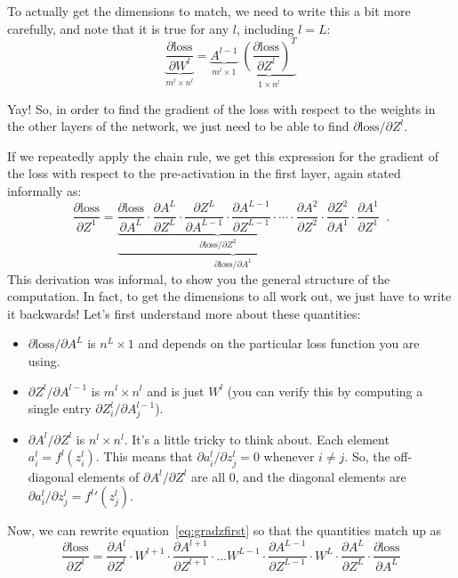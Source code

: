 \documentclass[11pt]{article}
\begin{document}
To actually get  the dimensions to match, we need to write this a bit
more carefully, and note that it is true for any $l$, including $l =  L$:
\begin{equation}
\label{eq:gradloss}
  \underbrace{\frac{\partial \text{loss}}{\partial W^l}}_{m^l \times n^l}  =  
\underbrace{A^{l-1}}_{m^l \times 1} \;
\underbrace{\left(\frac{\partial \text{loss}}{\partial
                                              Z^l}\right)^T}_{1 \times n^l}
\end{equation}

Yay!  So, in order to find the gradient of the loss with respect to the
weights in the other layers of the network, we just need to be able to
find $\partial \text{loss}/\partial{Z^l}$.  

If we repeatedly apply
the chain rule, we get this expression for the gradient of the loss
with respect to the pre-activation in the first layer, again stated informally as:
\begin{equation}
\label{eq:gradzfirst}
  \frac{\partial \text{loss}}{\partial Z^1} = \underbrace{\underbrace{
  \frac{\partial \text{loss}}{\partial A^L} \cdot
  \frac{\partial A^L}{\partial Z^L} \cdot
  \frac{\partial Z^L}{\partial A^{L-1}} \cdot
  \frac{\partial A^{L-1}}{\partial Z^{L-1}} \cdot \cdots \cdot
  \frac{\partial A^2}{\partial Z^2}}_{\partial \text{loss} / \partial Z^2}
  \cdot \frac{\partial Z^2}{\partial A^1}}
  _{\partial \text{loss} / \partial A^1} \cdot
  \frac{\partial A^1}{\partial Z^1} \;\;.
\end{equation}
This derivation was informal, to show  you the general structure of
the computation.  In fact, to get the dimensions to all work out, we
just have to write it backwards!  Let's first understand more about
these quantities:
\begin{itemize}
\item $\partial \text{loss}/\partial A^L$ is $n^L \times 1$ and
  depends on the particular loss function you are using.
\item $\partial Z^l / \partial A^{l-1}$ is $m^l \times n^l$ and is
  just $W^l$ (you can verify this by computing a single entry
  $\partial Z^l_i / \partial A^{l-1}_j$).
\item $\partial A^l/\partial Z^l$ is $n^l \times n^l$.  It's a little
  tricky to think about.  Each element 
  $a_i^l = f^l(z_i^l)$.
    This means that $\partial a_i^l / \partial
  z_j^l = 0$ whenever $i \not = j$.  So, the off-diagonal elements of 
  $\partial A^l/\partial Z^l$ are all 0, and the diagonal elements are 
  $\partial a_i^l / \partial  z_j^l = {f^l}'(z_j^l)$.  
\end{itemize}
Now, we can rewrite equation~\ref{eq:gradzfirst} so that the quantities
match up as
\begin{equation}
\label{eq:gradz}
\frac{\partial \text{loss}}{\partial Z^l} = 
\frac{\partial A^l}{\partial Z^l} \cdot 
W^{l+1} \cdot \frac{\partial A^{l+1}}{\partial Z^{l+1}} \cdot \ldots
W^{L-1} \cdot \frac{\partial A^{L-1}}{\partial Z^{L-1}} \cdot 
W^{L} \cdot \frac{\partial A^{L}}{\partial Z^{L}} \cdot
\frac{\partial \text{loss}}{\partial A^L}
\end{equation}
\end{document}
